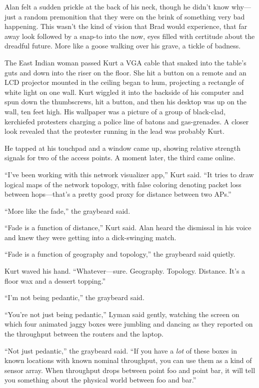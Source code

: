 Alan felt a sudden prickle at the back of his neck, though he didn't
know why---just a random premonition that they were on the brink of
something very bad happening.  This wasn't the kind of vision that
Brad would experience, that far away look followed by a snap-to into
the now, eyes filled with certitude about the dreadful future.  More
like a goose walking over his grave, a tickle of badness.

The East Indian woman passed Kurt a VGA cable that snaked into the
table's guts and down into the riser on the floor.  She hit a button
on a remote and an LCD projector mounted in the ceiling began to hum,
projecting a rectangle of white light on one wall.  Kurt wiggled it
into the backside of his computer and spun down the thumbscrews, hit a
button, and then his desktop was up on the wall, ten feet high.  His
wallpaper was a picture of a group of black-clad, kerchiefed
protesters charging a police line of batons and gas-grenades.  A
closer look revealed that the protester running in the lead was
probably Kurt.

He tapped at his touchpad and a window came up, showing relative
strength signals for two of the access points.  A moment later, the
third came online.

``I've been working with this network visualizer app,'' Kurt said. 
``It tries to draw logical maps of the network topology, with false
coloring denoting packet loss between hops---that's a pretty good
proxy for distance between two APs.''

``More like the fade,'' the graybeard said.

``Fade is a function of distance,'' Kurt said.  Alan heard the
dismissal in his voice and knew they were getting into a dick-swinging
match.

``Fade is a function of geography and topology,'' the graybeard said
quietly.

Kurt waved his hand.  ``Whatever---sure.  Geography.  Topology. 
Distance.  It's a floor wax and a dessert topping.''

``I'm not being pedantic,'' the graybeard said.

``You're not just being pedantic,'' Lyman said gently, watching the
screen on which four animated jaggy boxes were jumbling and dancing as
they reported on the throughput between the routers and the laptop.

``Not just pedantic,'' the graybeard said.  ``If you have a
\textit{lot} of these boxes in known locations with known nominal
throughput, you can use them as a kind of sensor array.  When
throughput drops between point foo and point bar, it will tell you
something about the physical world between foo and bar.''

